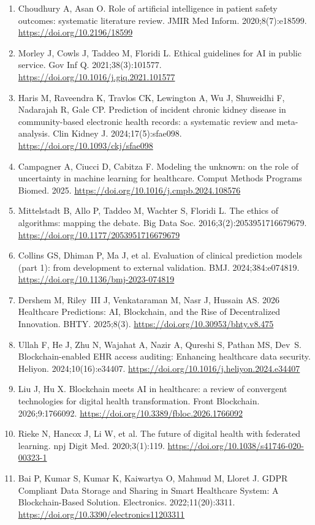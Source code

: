 \documentclass[11pt]{article}
\begin{document}
\begin{enumerate}
  prediction and distribution-free uncertainty quantification. Found
  Trends Mach Learn. 2023;16(4):494--591.
  \url{https://doi.org/10.1561/2200000101}
\item
  Choudhury A, Asan O. Role of artificial intelligence in patient safety
  outcomes: systematic literature review. JMIR Med Inform.
  2020;8(7):e18599. \url{https://doi.org/10.2196/18599}
\item
  Morley J, Cowls J, Taddeo M, Floridi L. Ethical guidelines for AI in
  public service. Gov Inf Q. 2021;38(3):101577.
  \url{https://doi.org/10.1016/j.giq.2021.101577}
\item
  Haris M, Raveendra K, Travlos CK, Lewington A, Wu J, Shuweidhi F,
  Nadarajah R, Gale CP. Prediction of incident chronic kidney disease in
  community-based electronic health records: a systematic review and
  meta-analysis. Clin Kidney J. 2024;17(5):sfae098.
  \url{https://doi.org/10.1093/ckj/sfae098}
\item
  Campagner A, Ciucci D, Cabitza F. Modeling the unknown: on the role of
  uncertainty in machine learning for healthcare. Comput Methods
  Programs Biomed. 2025.
  \url{https://doi.org/10.1016/j.cmpb.2024.108576}
\item
  Mittelstadt B, Allo P, Taddeo M, Wachter S, Floridi L. The ethics of
  algorithms: mapping the debate. Big Data Soc.
  2016;3(2):2053951716679679.
  \url{https://doi.org/10.1177/2053951716679679}
\item
  Collins GS, Dhiman P, Ma J, et al. Evaluation of clinical prediction
  models (part 1): from development to external validation. BMJ.
  2024;384:e074819. \url{https://doi.org/10.1136/bmj-2023-074819}
\item
  Dershem M, Riley~III J, Venkataraman M, Nasr J, Hussain AS. 2026
  Healthcare Predictions: AI, Blockchain, and the Rise of Decentralized
  Innovation. BHTY. 2025;8(3).
  \url{https://doi.org/10.30953/bhty.v8.475}
\item
  Ullah F, He J, Zhu N, Wajahat A, Nazir A, Qureshi S, Pathan MS,
  Dev~S. Blockchain-enabled EHR access auditing: Enhancing healthcare
  data security. Heliyon. 2024;10(16):e34407.
  \url{https://doi.org/10.1016/j.heliyon.2024.e34407}
\item
  Liu J, Hu X. Blockchain meets AI in healthcare: a review of convergent
  technologies for digital health transformation. Front Blockchain.
  2026;9:1766092. \url{https://doi.org/10.3389/fbloc.2026.1766092}
\item
  Rieke N, Hancox J, Li W, et al. The future of digital health with
  federated learning. npj Digit Med. 2020;3(1):119.
  \url{https://doi.org/10.1038/s41746-020-00323-1}
\item
  Bai P, Kumar S, Kumar K, Kaiwartya O, Mahmud M, Lloret J. GDPR
  Compliant Data Storage and Sharing in Smart Healthcare System: A
  Blockchain-Based Solution. Electronics. 2022;11(20):3311.
  \url{https://doi.org/10.3390/electronics11203311}
\end{enumerate}
\end{document}
